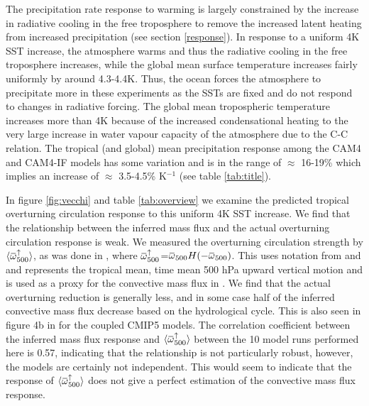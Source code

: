 \documentclass[letterpaper,12pt,titlepage,oneside,final]{book}
\newcommand{\overbar}[1]{\mkern 1.5mu\overline{\mkern-1.5mu#1\mkern-1.5mu}\mkern 1.5mu}
\begin{document}
The precipitation rate response to warming is largely constrained by the increase in radiative cooling in the free troposphere to remove the increased latent heating from increased precipitation (see section \ref{response}). In response to a uniform 4K SST increase, the atmosphere warms and thus the radiative cooling in the free troposphere increases, while the global mean surface temperature increases fairly uniformly by around 4.3-4.4K. Thus, the ocean forces the atmosphere to precipitate more in these experiments as the SSTs are fixed and do not respond to changes in radiative forcing. The global mean tropospheric temperature increases more than 4K because of the increased condensational heating to the very large increase in water vapour capacity of the atmosphere due to the C-C relation. The tropical (and global) mean precipitation response among the CAM4 and CAM4-IF models has some variation and is in the range of $\approx$ 16-19\% which implies an increase of $\approx$ 3.5-4.5\% K$^{-1}$ (see table \ref{tab:title}).

In figure \ref{fig:vecchi} and table \ref{tab:overview} we examine the predicted tropical overturning circulation response to this uniform 4K SST increase. We find that the relationship between the inferred mass flux and the actual overturning circulation response is weak. We measured the overturning circulation strength by $\langle\overbar{\omega}_{500}^{\uparrow}\rangle$, as was done in \citep{vecchi_weakening_2006}, where $\overbar{{\omega}}_{500}^{\uparrow}$=$\overbar{{\omega}}_{500}{H(-\overbar{\omega}_{500})}$. This uses notation from \cite{schneider_water_2010} and \cite{merlis_changes_2011} and represents the tropical mean, time mean 500 hPa upward vertical motion and is used as a proxy for the convective mass flux in \citep{vecchi_weakening_2006}. We find that the actual overturning reduction is generally less, and in some case half of the inferred convective mass flux decrease based on the hydrological cycle. This is also seen in figure 4b in \citep{vecchi_global_2007} for the coupled CMIP5 models. The correlation coefficient between the inferred mass flux response and $\langle\overbar{\omega}_{500}^{\uparrow}\rangle$ between the 10 model runs performed here is 0.57, indicating that the relationship is not particularly robust, however, the models are certainly not independent. This would seem to indicate that the response of $\langle\overbar{\omega}_{500}^{\uparrow}\rangle$ does not give a perfect estimation of the convective mass flux response.
\end{document}
